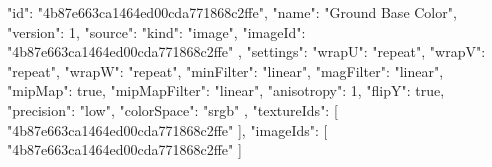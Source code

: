 {
  "id": "4b87e663ca1464ed00cda771868c2ffe",
  "name": "Ground Base Color",
  "version": 1,
  "source": {
    "kind": "image",
    "imageId": "4b87e663ca1464ed00cda771868c2ffe"
  },
  "settings": {
    "wrapU": "repeat",
    "wrapV": "repeat",
    "wrapW": "repeat",
    "minFilter": "linear",
    "magFilter": "linear",
    "mipMap": true,
    "mipMapFilter": "linear",
    "anisotropy": 1,
    "flipY": true,
    "precision": "low",
    "colorSpace": "srgb"
  },
  "textureIds": [
    "4b87e663ca1464ed00cda771868c2ffe"
  ],
  "imageIds": [
    "4b87e663ca1464ed00cda771868c2ffe"
  ]
}

